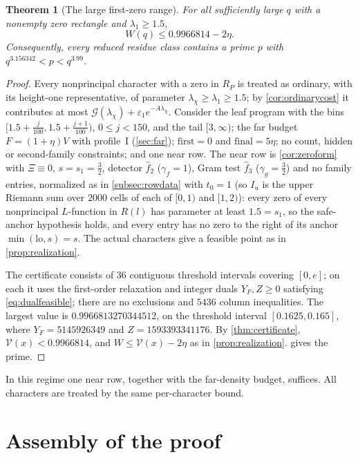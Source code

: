 \documentclass[11pt]{amsart}
\numberwithin{equation}{section}
\theoremstyle{plain}
\newtheorem{theorem}{Theorem}[section]
\theoremstyle{definition}
\theoremstyle{remark}
\newcommand{\eps}{\varepsilon}
\newcommand{\lo}{\mathrm{lo}}
\newcommand{\1}{\mathbf{1}}
\begin{document}
\begin{theorem}[The large first-zero range]\label{thm:large}
For all sufficiently large $q$ with a nonempty zero rectangle and $\lambda_1\ge1.5$,
\[
  W(q)\le0.9966814-2\eta.
\]
Consequently, every reduced residue class contains a prime $p$ with
$q^{3.156342}<p<q^{3.99}$.
\end{theorem}

\begin{proof}
Every nonprincipal character with a zero in $R_P$ is treated as ordinary, with its height-one
representative, of parameter $\lambda_\chi\ge\lambda_1\ge1.5$; by \cref{cor:ordinarycost} it contributes at most
$\mathcal G(\lambda_\chi)+\eps_1e^{-A\lambda_\chi}$. Consider the leaf program with the bins
$[1.5+\frac j{100},1.5+\frac{j+1}{100})$, $0\le j<150$, and the tail $[3,\infty)$; the far budget
$F=(1+\eta)V$ with profile~I (\cref{sec:far}); $\mathrm{first}=0$ and $\mathrm{final}=5\eta$; no count, hidden or second-family
constraints; and one near row. The near row is \cref{cor:zeroform} with $\Xi\equiv0$, $s=s_1=\frac32$,
detector $\hat f_2$ ($\gamma_f=1$), Gram test $\hat f_3$ ($\gamma_g=\frac32$) and no family entries, normalized as in
\cref{subsec:rowdata} with $t_0=1$ (so $I_u$ is the upper Riemann sum over $2000$ cells of each of
$[0,1)$ and $[1,2)$): every zero of every
nonprincipal $L$-function in $R(l)$ has parameter at least $1.5=s_1$, so the safe-anchor hypothesis
holds, and every entry has no zero to the right of its anchor $\min(\lo,s)=s$. The actual characters
give a feasible point as in \cref{prop:realization}.

The certificate consists of $36$ contiguous threshold intervals covering $[0,e]$; on each it uses the
first-order relaxation and integer duals $Y_F,Z\ge0$ satisfying \eqref{eq:dualfeasible}; there are no
exclusions and $5436$ column inequalities. The largest value is
$0.9966813270344512$, on the threshold interval $[0.1625,0.165]$, where $Y_F=5145926349$ and
$Z=1593393341176$. By \cref{thm:certificate}, $\mathcal V(x)<0.9966814$, and $W\le\mathcal V(x)-2\eta$ as in
\cref{prop:realization}.  gives the prime.
\end{proof}

In this regime one near row, together with the far-density budget, suffices.
All characters are treated by the same per-character bound.

\section{Assembly of the proof}\label{sec:join}
\end{document}
